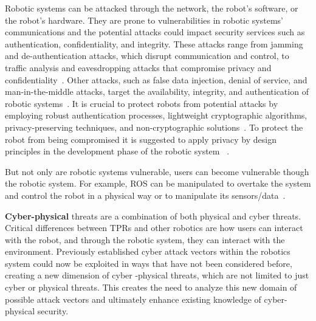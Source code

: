 Robotic systems can be attacked through the network, the robot's software, or the robot's hardware. They are prone to vulnerabilities in
robotic
systems'
communications and the potential attacks could impact security services such as authentication, confidentiality, and
integrity. These attacks range from jamming and de-authentication attacks, which disrupt communication and control, to traffic analysis
and eavesdropping attacks that compromise privacy and confidentiality~\cite[122]{robotics_cyber_security_2022}. Other attacks, such as false data injection, denial of service,
and man-in-the-middle attacks, target the availability, integrity, and authentication of robotic systems~\cite[126-128]{
  robotics_cyber_security_2022}. It is crucial to protect robots from potential attacks by employing robust authentication processes,
lightweight cryptographic algorithms, privacy-preserving techniques, and non-cryptographic solutions~\cite[147-149]{
  robotics_cyber_security_2022}. To protect the robot from being compromised it is suggested to apply privacy by design principles in the
development phase of the robotic system ~\cite[]{smart_design_engineering_2020,role_of_security_in_human_robot_2017, robotics_cyber_security_2022}.

But not only are robotic systems vulnerable, users can become vulnerable though the robotic system. For example, \ac{ROS} can be manipulated to overtake the system and control the robot in a physical way or to manipulate its sensors/data~\cite[]{role_of_security_in_human_robot_2017}.


\textbf{Cyber-physical} threats are a combination of both physical and cyber threats.
Critical differences between TPRs and other robotics are how users can interact with the robot, and through the robotic system,
they can interact with the environment. Previously established cyber attack
vectors within the robotics system could now be exploited in ways that have not been considered before, creating a new dimension of cyber
-physical threats, which are not limited to just cyber or physical threats. This creates the need to analyze this new domain of
possible attack vectors and ultimately enhance existing knowledge of cyber-physical security.

